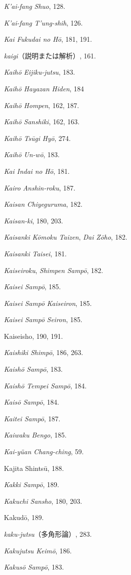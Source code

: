 \documentclass[11pt]{article}
\begin{document}
\emph{K'ai-fang Shuo}, 128.\par
\emph{K'ai-fang T'ung-shih}, 126.\par
\emph{Kai Fukudai no Hō}, 181, 191.\par
\emph{kaigi}（説明または解析）, 161.\par
\emph{Kaihō Eijiku-jutsu}, 183.\par
\emph{Kaihō Hayazan Hiden}, 184\par
\emph{Kaihō Hompen}, 162, 187.\par
\emph{Kaihō Sanshiki}, 162, 163.\par
\emph{Kaihō Tsūgi Hyō}, 274.\par
\emph{Kaihō Un-wō}, 183.\par
\emph{Kai Indai no Hō}, 181.\par
\emph{Kairo Anshin-roku}, 187.\par
\emph{Kaisan Chiyeguruma}, 182.\par
\emph{Kaisan-ki}, 180, 203.\par
\emph{Kaisanki Kōmoku Taizen}, \emph{Dai Zōho}, 182.\par
\emph{Kaisanki Taisei}, 181.\par
\emph{Kaiseiroku}, \emph{Shimpen Sampō}, 182.\par
\emph{Kaisei Sampō}, 185.\par
\emph{Kaisei Sampō Kaiseiron}, 185.\par
\emph{Kaisei Sampō Seiron}, 185.\par
Kaiseisho, 190, 191.\par
\emph{Kaishiki Shimpō}, 186, 263.\par
\emph{Kaishō Sampō}, 183.\par
\emph{Kaishō Tempei Sampō}, 184.\par
\emph{Kaisō Sampō}, 184.\par
\emph{Kaitei Sampō}, 187.\par
\emph{Kaiwaku Bengo}, 185.\par
\emph{Kai-yüan Chang-ching}, 59.\par
Kajita Shintsū, 188.\par
\emph{Kakki Sampō}, 189.\par
\emph{Kakuchi Sansho}, 180, 203.\par
Kakudō, 189.\par
\emph{kaku-jutsu}（多角形論）, 283.\par
\emph{Kakujutsu Keimō}, 186.\par
\emph{Kakusō Sampō}, 183.\par
\end{document}

